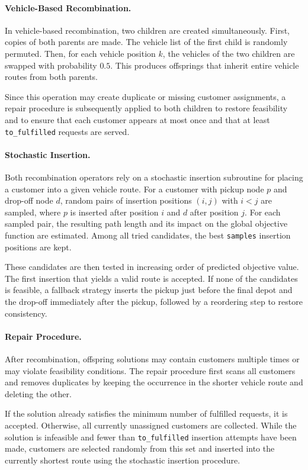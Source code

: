 \documentclass[12pt]{article}
\begin{document}
\paragraph{Vehicle-Based Recombination.}
In vehicle-based recombination, two children are created simultaneously. First, copies of both parents are made. The vehicle list of the first child is randomly permuted. Then, for each vehicle position $k$, the vehicles of the two children are swapped with probability $0.5$. This produces offsprings that inherit entire vehicle routes from both parents.

Since this operation may create duplicate or missing customer assignments, a repair procedure is subsequently applied to both children to restore feasibility and to ensure that each customer appears at most once and that at least \texttt{to\_fulfilled} requests are served.

\paragraph{Stochastic Insertion.}
Both recombination operators rely on a stochastic insertion subroutine for placing a customer into a given vehicle route. For a customer with pickup node $p$ and drop-off node $d$, random pairs of insertion positions $(i,j)$ with $i<j$ are sampled, where $p$ is inserted after position $i$ and $d$ after position $j$. For each sampled pair, the resulting path length and its impact on the global objective function are estimated. Among all tried candidates, the best \texttt{samples} insertion positions are kept.

These candidates are then tested in increasing order of predicted objective value. The first insertion that yields a valid route is accepted. If none of the candidates is feasible, a fallback strategy inserts the pickup just before the final depot and the drop-off immediately after the pickup, followed by a reordering step to restore consistency.

\paragraph{Repair Procedure.}
After recombination, offspring solutions may contain customers multiple times or may violate feasibility conditions. The repair procedure first scans all customers and removes duplicates by keeping the occurrence in the shorter vehicle route and deleting the other.

If the solution already satisfies the minimum number of fulfilled requests, it is accepted. Otherwise, all currently unassigned customers are collected. While the solution is infeasible and fewer than \texttt{to\_fulfilled} insertion attempts have been made, customers are selected randomly from this set and inserted into the currently shortest route using the stochastic insertion procedure.
\end{document}

